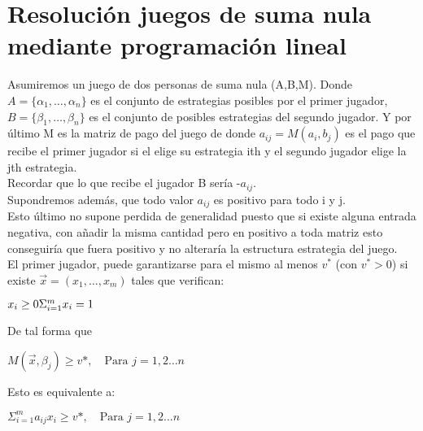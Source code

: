 \documentclass[10pt,a4paper]{book}
\begin{document}
\chapter{Resolución juegos de suma nula mediante programación lineal}

Asumiremos un juego de dos personas de suma nula (A,B,M). Donde $A=\{\alpha_1, \ldots ,\alpha_n\}$ es el conjunto de estrategias posibles por el primer jugador, $B=\{\beta_1, \ldots ,\beta_n\}$ es el conjunto de posibles estrategias del segundo jugador. Y por último M es la matriz de pago del juego de donde $a_{ij}=M(a_i,b_j)$ es el pago que recibe el primer jugador si el elige su estrategia ith y el segundo jugador elige la jth estrategia. \\
Recordar que lo que recibe el jugador B sería -$a_{ij}$.\\

Supondremos además, que todo valor $a_{ij}$ es positivo para todo i y j.\\
Esto último no supone perdida de generalidad puesto que si existe alguna entrada negativa, con añadir la misma cantidad pero en positivo a toda matriz esto conseguiría que fuera positivo y no alteraría la estructura estrategia del juego.\\

El primer jugador, puede garantizarse para el mismo al menos $v^{*}$ (con $v^{*}>0$) si existe $\vec{x}=(x_1, \ldots , x_m)$ tales que verifican:\\

\begin{center}

$x_i \geq 0 \newline
\Sigma^m_{i=1} x_i=1$

\end{center}

De tal forma que 
\begin{center}

$M(\vec{x},\beta_j) \geq v*, \quad \mbox{Para } j=1,2 \ldots n$

\end{center}

Esto es equivalente a: 

\begin{center}

$\Sigma^m_{i=1} a_{ij}x_i \geq v*, \quad \mbox{Para } j=1,2 \ldots n$

\end{center}
\end{document}
